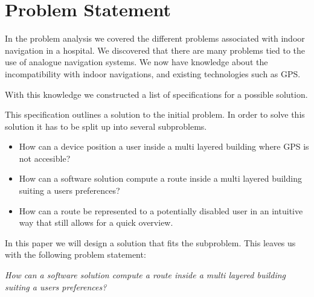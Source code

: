 \chapter{Problem Statement}




In the problem analysis we covered the different problems associated with indoor navigation in a hospital.
We discovered that there are many problems tied to the use of analogue navigation systems. We now have knowledge about the incompatibility with indoor navigations, and existing technologies such as GPS.



With this knowledge we constructed a list of specifications for a possible solution.




This specification outlines a solution to the initial problem. In order to solve this solution it has to be split up into several subproblems.

\begin{itemize}
	\item How can a device position a user inside a multi layered building where GPS is not accesible?
	\item How can a software solution compute a route inside a multi layered building suiting a users preferences?
	\item How can a route be represented to a potentially disabled user in an intuitive way that still allows for a quick overview.
\end{itemize}

In this paper we will design a solution that fits the  subproblem. This leaves us with the following problem statement:

\begin{displayquote}
    \textit{How can a software solution compute a route inside a multi layered building suiting a users preferences?}\label{sub:problem_statement}
\end{displayquote}

